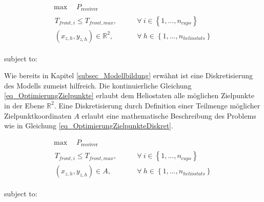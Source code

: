 \begin{equation} \label{eq_OptimierungZielpunkte}
    \begin{gathered}
        \max \quad P_{\text {receiver }}  \qquad \\
        \begin{aligned}
            T_{front,i} \leq T_{front,max}, \qquad                 & \forall~i \in \left\{1, ..., n_{cups} \right\}       \\
            \left(x_{z,h}, y_{z,h}\right) \in \mathbb{R}^2, \qquad & \forall~h \in \left\{1, ..., n_{heliostats} \right\}
        \end{aligned}
    \end{gathered}
\end{equation}

\vspace*{-2.95\baselineskip}
\qquad subject to:
\vspace*{1.95\baselineskip}

Wie bereits in Kapitel \ref{subsec_Modellbildung} erwähnt ist eine Diskretisierung des Modells zumeist hilfreich.
Die kontinuierliche Gleichung \ref{eq_OptimierungZielpunkte} erlaubt dem Heliostaten alle möglichen Zielpunkte in der Ebene $\mathbb{R}^2$.
Eine Diskretisierung durch Definition einer Teilmenge möglicher Zielpunktkoordinaten $A$ erlaubt eine mathematische Beschreibung des Problems wie in Gleichung \ref{eq_OptimierungZielpunkteDiskret}.

\begin{equation} \label{eq_OptimierungZielpunkteDiskret}
    \begin{gathered}
        \max \quad P_{\text {receiver }}  \qquad \\
        \begin{aligned}
            T_{front,i} \leq T_{front,max}, \qquad      & \forall~i \in \left\{1, ..., n_{cups} \right\}       \\
            \left(x_{z,h}, y_{z,h}\right) \in A, \qquad & \forall~h \in \left\{1, ..., n_{heliostats} \right\}
        \end{aligned}
    \end{gathered}
\end{equation}

\enlargethispage*{2\baselineskip}
\vspace*{-2.95\baselineskip}
\qquad subject to:
\vspace*{1.95\baselineskip}

